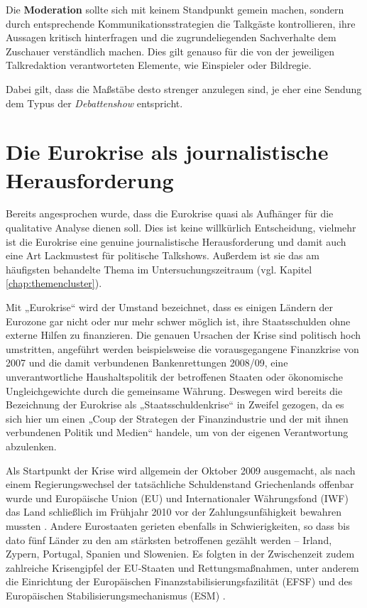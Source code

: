 Die \textbf{Moderation} sollte sich mit keinem Standpunkt gemein machen, sondern durch entsprechende Kommunikationsstrategien die Talkgäste kontrollieren, ihre Aussagen kritisch hinterfragen und die zugrundeliegenden Sachverhalte dem Zuschauer verständlich machen. Dies gilt genauso für die von der jeweiligen Talkredaktion verantworteten Elemente, wie Einspieler oder Bildregie.

Dabei gilt, dass die Maßstäbe desto strenger anzulegen sind, je eher eine Sendung dem Typus der \textit{Debattenshow} entspricht.

\section{Die Eurokrise als journalistische Herausforderung}

Bereits angesprochen wurde, dass die Eurokrise quasi als Aufhänger für die qualitative Analyse dienen soll. Dies ist keine willkürlich Entscheidung, vielmehr ist die Eurokrise eine genuine journalistische Herausforderung und damit auch eine Art Lackmustest für politische Talkshows. Außerdem ist sie das am häufigsten behandelte Thema im Untersuchungszeitraum (vgl. Kapitel \vref{chap:themencluster}).

Mit „Eurokrise“ wird der Umstand bezeichnet, dass es einigen Ländern der Eurozone gar nicht oder nur mehr schwer möglich ist, ihre Staatsschulden ohne externe Hilfen zu finanzieren. Die genauen Ursachen der Krise sind politisch hoch umstritten, angeführt werden beispielsweise die vorausgegangene Finanzkrise von 2007 und die damit verbundenen Bankenrettungen 2008/09, eine unverantwortliche Haushaltspolitik der betroffenen Staaten oder ökonomische Ungleichgewichte durch die gemeinsame Währung. Deswegen wird bereits die Bezeichnung der Eurokrise als „Staatsschuldenkrise“ in Zweifel gezogen, da es sich hier um einen „Coup der Strategen der Finanzindustrie und der mit ihnen verbundenen Politik und Medien“ \parencite{mullerEuroKriseLugeSystemrelevanz2011} handele, um von der eigenen Verantwortung abzulenken.

Als Startpunkt der Krise wird allgemein der Oktober 2009 ausgemacht, als nach einem Regierungswechsel der tatsächliche Schuldenstand Griechenlands offenbar wurde und Europäische Union (EU) und Internationaler Währungsfond (IWF) das Land schließlich im Frühjahr 2010 vor der Zahlungsunfähigkeit bewahren mussten \parencites{deutschewelleStationenKrise200920112012}{kaufmannSchummelGriechenMachenUnseren2012}. Andere Eurostaaten gerieten ebenfalls in Schwierigkeiten, so dass bis dato fünf Länder zu den am stärksten betroffenen gezählt werden – Irland, Zypern, Portugal, Spanien und Slowenien. Es folgten in der Zwischenzeit zudem zahlreiche Krisengipfel der EU-Staaten und Rettungsmaßnahmen, unter anderem die Einrichtung der Europäischen Finanzstabilisierungsfazilität (EFSF) und des Europäischen Stabilisierungsmechanismus (ESM) \parencite[24–37]{kaufmannSchummelGriechenMachenUnseren2012}.

